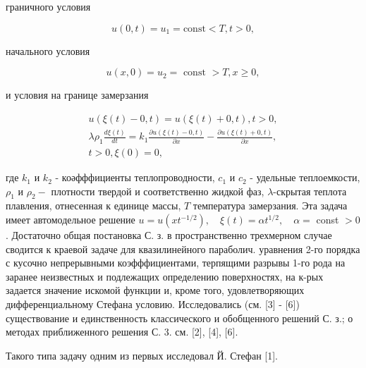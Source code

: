 \documentclass[10pt]{article}
\begin{document}
граничного условия



\[

u(0, t)=u_{1}=\mathrm{const}<T, t>0,

\]



начального условия



\[

u(x, 0)=u_{2}=\text { const }>T, x \geqslant 0,

\]



и условия на границе замерзания



\[

\begin{gathered}

u(\xi(t)-0, t)=u(\xi(t)+0, t), t>0, \\

\lambda \rho_{1} \frac{d \xi(t)}{d t}=k_{1} \frac{\partial u(\xi(t)-0, t)}{\partial x}-\frac{\partial u(\xi(t)+0, t)}{\partial x}, \\

t>0, \xi(0)=0,

\end{gathered}

\]



где $k_{1}$ и $k_{2}$ - коәфффициенты теплопроводности, $c_{1}$ и $c_{2}$ - удельные теплоемкости, $\rho_{1}$ и $\rho_{2}-$ плотности твердой и соответственно жидкой фаз, $\lambda$-скрытая теплота плавления, отнесенная к единице массы, $T$ температура замерзания. Эта задача имеет автомодельное решение $u=u\left(x t^{-1 / 2}\right), \quad \xi(t)=\alpha t^{1 / 2}, \quad \alpha=$ const $>0$. Достаточно общая постановка С. з. в пространственно трехмерном случае сводится к краевой задаче для квазилинейного параболич. уравнения 2-го порядка с кусочно непрерывными коэфффициентами, терпящими разрывы 1-го рода на заранее неизвестных и подлежащих определению поверхностях, на к-рых задается значение искомой функции и, кроме того, удовлетворяющих дифференциальному Стефана условию. Исследовались (см. [3] - [6]) существование и единственность классического и обобщенного решений С. з.; о методах приближенного решения С. 3. см. [2], [4], [6].



Такого типа задачу одним из первых исследовал Й. Стефан [1].
\end{document}
